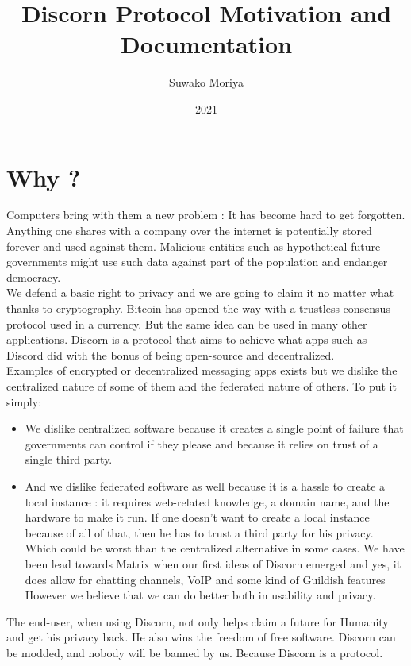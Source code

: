 \documentclass[a4paper,10pt]{article}
\title{Discorn Protocol Motivation and Documentation}
\author{Suwako Moriya}
\date{2021}
\begin{document}
    \maketitle
    \tableofcontents
    \section{Why ?}
        Computers bring with them a new problem : It has become hard to get forgotten.
        Anything one shares with a company over the internet is potentially stored forever and used against them.
        Malicious entities such as hypothetical future governments might use such data against part of the population
        and endanger democracy.\\
        
        We defend a basic right to privacy and we are going to claim it no matter what thanks to cryptography.
        Bitcoin has opened the way with a trustless consensus protocol used in a currency. But the same idea
        can be used in many other applications. Discorn is a protocol that aims to achieve what apps such as Discord did
        with the bonus of being open-source and decentralized.\\
        
        
        Examples of encrypted or decentralized messaging apps exists but we dislike the centralized nature of some of them
        and the federated nature of others. To put it simply:
        \begin{itemize}
         \item We dislike centralized software because it creates a single point of failure that governments can control
         if they please and because it relies on trust of a single third party.
        
        \item And we dislike federated software as well because it is a hassle to create a local instance : it requires web-related
         knowledge, a domain name, and the hardware to make it run. If one doesn't want to create a local instance because of all of that,
         then he has to trust a third party for his privacy. Which could be worst than the centralized alternative in some cases.
         We have been lead towards Matrix when our first ideas of Discorn emerged and yes, it does allow for chatting channels, VoIP and some kind of Guildish features
         However we believe that we can do better both in usability and privacy.
        \end{itemize}
        The end-user, when using Discorn, not only helps claim a future for Humanity and get his privacy back. He also wins the freedom
        of free software. Discorn can be modded, and nobody will be banned by us. Because Discorn is a protocol.
    
\end{document}
